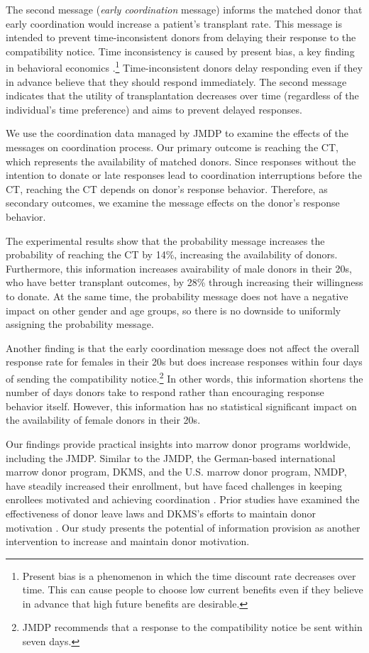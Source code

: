 \documentclass[12pt, a4paper]{article}
\begin{document}
The second message (\emph{early coordination} message) informs the matched donor that early coordination would increase a patient's transplant rate. This message is intended to prevent time-inconsistent donors from delaying their response to the compatibility notice. Time inconsistency is caused by present bias, a key finding in behavioral economics \citep{Laibson1997, ODonoghue2001}.\footnote{Present bias is a phenomenon in which the time discount rate decreases over time. This can cause people to choose low current benefits even if they believe in advance that high future benefits are desirable.} Time-inconsistent donors delay responding even if they in advance believe that they should respond immediately. The second message indicates that the utility of transplantation decreases over time (regardless of the individual's time preference) and aims to prevent delayed responses.

We use the coordination data managed by JMDP to examine the effects of the messages on coordination process. Our primary outcome is reaching the CT, which represents the availability of matched donors. Since responses without the intention to donate or late responses lead to coordination interruptions before the CT, reaching the CT depends on donor's response behavior. Therefore, as secondary outcomes, we examine the message effects on the donor's response behavior.

The experimental results show that the probability message increases the probability of reaching the CT by 14\%, increasing the availability of donors. Furthermore, this information increases avairability of male donors in their 20s, who have better transplant outcomes, by 28\% through increasing their willingness to donate. At the same time, the probability message does not have a negative impact on other gender and age groups, so there is no downside to uniformly assigning the probability message.

Another finding is that the early coordination message does not affect the overall response rate for females in their 20s but does increase responses within four days of sending the compatibility notice.\footnote{JMDP recommends that a response to the compatibility notice be sent within seven days.} In other words, this information shortens the number of days donors take to respond rather than encouraging response behavior itself. However, this information has no statistical significant impact on the availability of female donors in their 20s.

Our findings provide practical insights into marrow donor programs worldwide, including the JMDP. Similar to the JMDP, the German-based international marrow donor program, DKMS, and the U.S. marrow donor program, NMDP, have steadily increased their enrollment, but have faced challenges in keeping enrollees motivated and achieving coordination \citep{Switzer1999, Switzer2004, Haylock2024}. Prior studies have examined the effectiveness of donor leave laws \citep{Lacetera2014} and DKMS's efforts to maintain donor motivation \citep{Haylock2024}. Our study presents the potential of information provision as another intervention to increase and maintain donor motivation.
\end{document}
